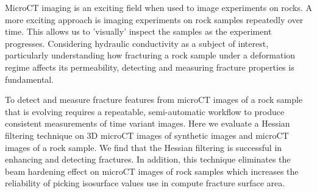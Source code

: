 \documentclass{edger}
\begin{document}
\thispagestyle{plain} %

\institution{}

\begin{edgerabstract}
MicroCT imaging is an exciting field when used to image experiments on rocks. A more exciting approach is imaging experiments on rock samples repeatedly over time. This allows us to 'visually' inspect the samples as the experiment progresses. Considering hydraulic conductivity as a subject of interest, particularly understanding how fracturing a rock sample under a deformation regime affects its permeability, detecting and measuring fracture properties is fundamental.

To detect and measure fracture features from microCT images of a rock sample that is evolving requires a repeatable, semi-automatic workflow to produce consistent measurements of time variant images. Here we evaluate a Hessian filtering technique on 3D microCT images of synthetic images and microCT images of a rock sample. We find that the Hessian filtering is successful in enhancing and detecting fractures. In addition, this technique eliminates the beam hardening effect on microCT images of rock samples which increases the reliability of picking isosurface values use in compute fracture surface area. 
\end{edgerabstract}
\end{document}
